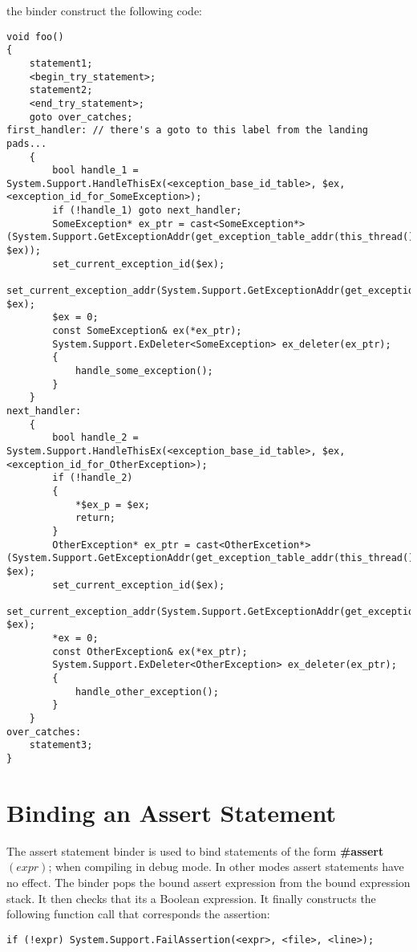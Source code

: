 \documentclass[a4paper,oneside,11pt]{book}
\theoremstyle{definition}
\begin{document}
the binder construct the following code:
\clearpage
\lstset{language=Cmajor}
\begin{lstlisting}[frame=trBL]
void foo()
{
    statement1;
    <begin_try_statement>;
    statement2;
    <end_try_statement>;
    goto over_catches;
first_handler: // there's a goto to this label from the landing pads...
    {
        bool handle_1 = System.Support.HandleThisEx(<exception_base_id_table>, $ex, <exception_id_for_SomeException>);
        if (!handle_1) goto next_handler;
        SomeException* ex_ptr = cast<SomeException*>(System.Support.GetExceptionAddr(get_exception_table_addr(this_thread()), $ex));
        set_current_exception_id($ex);
        set_current_exception_addr(System.Support.GetExceptionAddr(get_exception_table_addr(this_thread()), $ex);
        $ex = 0;
        const SomeException& ex(*ex_ptr);
        System.Support.ExDeleter<SomeException> ex_deleter(ex_ptr);
        {
            handle_some_exception();
        }
    }
next_handler:
    {
        bool handle_2 = System.Support.HandleThisEx(<exception_base_id_table>, $ex, <exception_id_for_OtherException>);
        if (!handle_2)
        {
            *$ex_p = $ex;
            return;
        }
        OtherException* ex_ptr = cast<OtherExcetion*>(System.Support.GetExceptionAddr(get_exception_table_addr(this_thread()), $ex);
        set_current_exception_id($ex);
        set_current_exception_addr(System.Support.GetExceptionAddr(get_exception_table_addr(this_thread()), $ex);
        *ex = 0;
        const OtherException& ex(*ex_ptr);
        System.Support.ExDeleter<OtherException> ex_deleter(ex_ptr);
        {
            handle_other_exception();
        }
    }
over_catches:
    statement3;
}
\end{lstlisting}

\section{Binding an Assert Statement}

The assert statement binder is used to bind statements of the form \textbf{\#assert}$(expr)$;
when compiling in debug mode. In other modes assert statements have no effect.
The binder pops the bound assert expression from the bound expression stack.
It then checks that its a Boolean expression.
It finally constructs the following function call that corresponds the assertion:

\lstset{language=Cmajor}
\begin{lstlisting}[frame=trBL]
if (!expr) System.Support.FailAssertion(<expr>, <file>, <line>);
\end{lstlisting}
\end{document}

